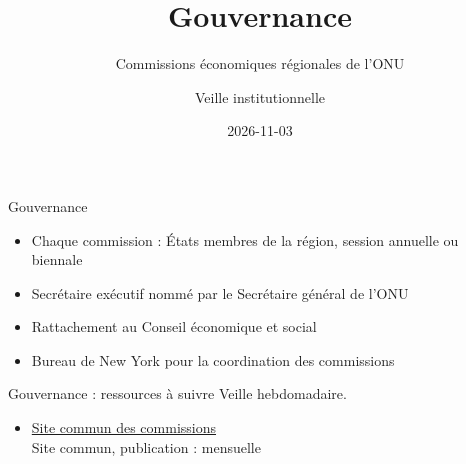 \documentclass[aspectratio=169,11pt]{beamer}
\title{Gouvernance}
\subtitle{Commissions économiques régionales de l'ONU}
\author{Veille institutionnelle}
\date{2026-11-03}
\begin{document}
\begin{frame}\titlepage\end{frame}

\begin{frame}{Gouvernance}
\begin{itemize}
\item Chaque commission : États membres de la région, session annuelle ou biennale
\item Secrétaire exécutif nommé par le Secrétaire général de l'ONU
\item Rattachement au Conseil économique et social
\item Bureau de New York pour la coordination des commissions
\end{itemize}
\end{frame}

\begin{frame}{Gouvernance : ressources à suivre}
\small
Veille hebdomadaire.
\begin{itemize}
\item \href{https://www.regionalcommissions.org}{Site commun des commissions}\\{\footnotesize Site commun, publication : mensuelle}
\end{itemize}
\end{frame}
\end{document}
